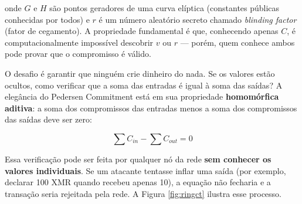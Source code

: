 onde $G$ e $H$ são pontos geradores de uma curva elíptica (constantes públicas conhecidas por todos) e $r$ é um número aleatório secreto chamado \textit{blinding factor} (fator de cegamento). A propriedade fundamental é que, conhecendo apenas $C$, é computacionalmente impossível descobrir $v$ ou $r$ --- porém, quem conhece ambos pode provar que o compromisso é válido.

O desafio é garantir que ninguém crie dinheiro do nada. Se os valores estão ocultos, como verificar que a soma das entradas é igual à soma das saídas? A elegância do Pedersen Commitment está em sua propriedade \textbf{homomórfica aditiva}: a soma dos compromissos das entradas menos a soma dos compromissos das saídas deve ser zero:

\begin{equation}
\label{eq:ringct-soma}
\sum C_{in} - \sum C_{out} = 0
\end{equation}

Essa verificação pode ser feita por qualquer nó da rede \textbf{sem conhecer os valores individuais}. Se um atacante tentasse inflar uma saída (por exemplo, declarar 100 XMR quando recebeu apenas 10), a equação não fecharia e a transação seria rejeitada pela rede. A Figura \ref{fig:ringct} ilustra esse processo.

